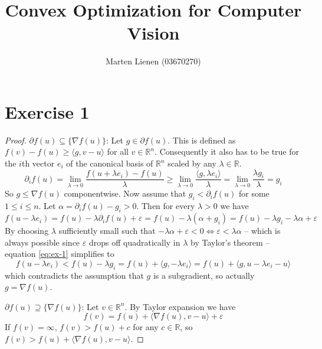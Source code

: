 \documentclass[10pt,a4paper]{article}
\title{Convex Optimization for Computer Vision}
\author{Marten Lienen (03670270)}
\begin{document}
\maketitle

\section*{Exercise 1}

\begin{proof}
  $\partial f(u) \subseteq \{ \nabla f(u) \}$: Let $g \in \partial f(u)$.
  This is defined as $f(v) - f(u) \ge \langle g, v - u \rangle$ for all $v \in \mathbb{R}^{n}$.
  Consequently it also has to be true for the $i$th vector $e_{i}$ of the canonical basis of $\mathbb{R}^{n}$ scaled by any $\lambda \in \mathbb{R}$.
  \begin{equation*}
    \partial_{i} f(u) = \lim_{\lambda \rightarrow 0} \frac{f(u + \lambda e_{i}) - f(u)}{\lambda} \ge \lim_{\lambda \rightarrow 0} \frac{\langle g, \lambda e_{i} \rangle}{\lambda} = \lim_{\lambda \rightarrow 0} \frac{\lambda g_{i}}{\lambda} = g_{i}
  \end{equation*}
  So $g \le \nabla f(u)$ componentwise.
  Now assume that $g_{i} < \partial_{i} f(u)$ for some $1 \le i \le n$.
  Let $\alpha = \partial_{i} f(u) - g_{i} > 0$.
  Then for every $\lambda > 0$ we have
  \begin{equation}\label{eq:ex-1}
    f(u - \lambda e_{i}) = f(u) - \lambda \partial_{i} f(u) + \varepsilon = f(u) - \lambda (\alpha + g_{i}) = f(u) - \lambda g_{i} - \lambda \alpha + \varepsilon
  \end{equation}
  By choosing $\lambda$ sufficiently small such that $-\lambda \alpha + \varepsilon < 0 \Leftrightarrow \varepsilon < \lambda \alpha$ -- which is always possible since $\varepsilon$ drops off quadratically in $\lambda$ by Taylor's theorem -- equation \ref{eq:ex-1} simplifies to
  \begin{equation*}
    f(u - \lambda e_{i}) < f(u) - \lambda g_{i} = f(u) + \langle g, -\lambda e_{i} \rangle = f(u) + \langle g, u - \lambda e_{i} - u \rangle
  \end{equation*}
  which contradicts the assumption that $g$ is a subgradient, so actually $g = \nabla f(u)$.

  $\partial f(u) \supseteq \{ \nabla f(u) \}$: Let $v \in \mathbb{R}^{n}$.
  By Taylor expansion we have
  \begin{equation*}
    f(v) = f(u) + \langle \nabla f(u), v - u \rangle + \varepsilon
  \end{equation*}
  If $f(v) = \infty$, $f(v) > f(u) + c$ for any $c \in \mathbb{R}$, so $f(v) > f(u) + \langle \nabla f(u), v - u \rangle$.


\end{proof}
\end{document}
